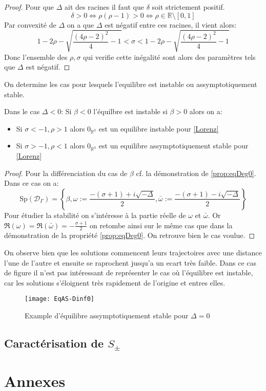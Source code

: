 \documentclass{article}
\newcommand{\R}{\mathbb{R}}
\newtheorem[M , nocut]{prop}{Proposition}[section]
\newtheorem[M]{propt}{Propriété}[section]
\newtheorem[L , nocut]{thm}{Théoreme}
\newtheorem[L]{cor}{Corollaire}
\begin{document}
\begin{proof}
    Pour que $\Delta$ ait des racines il faut que $\delta$ soit strictement positif.
    \[
    \delta > 0 \Leftrightarrow \rho(\rho-1) > 0 \Leftrightarrow \rho \in \R \setminus [0,1]
    \]Par convexité de $\Delta$ on a que $\Delta$ est négatif entre ces racines, il vient alors:
    \[
        1-2 \rho - \sqrt{ \frac{(4\rho-2)^2}{4} -1 } < \sigma < 1-2 \rho - \sqrt{ \frac{(4\rho-2)^2}{4} -1 }
    \]Donc l'ensemble des $\rho,\sigma$ qui verifie cette inégalité sont alors des paramètres tels que $\Delta$ est négatif.
\end{proof}
On determine les cas pour lesquels l'equilibre est instable ou assymptotiquement stable.
\begin{prop}
    Dans le cas $\Delta<0$:
    Si $\beta <0$ l'équilbre est instable si $\beta>0$ alors on a:
    \begin{itemize}
        \item Si $\sigma < -1 , \rho > 1$ alors $0_{\R^3}$ est un equilibre instable pour \eqref{Lorenz}
        \item Si $\sigma > -1 , \rho < 1$ alors $0_{\R^3}$ est un equilibre assymptotiquement stable pour \eqref{Lorenz}
    \end{itemize}
\end{prop}
\begin{proof}
    Pour la différenciation du cas de $\beta$ cf. la démonstration de \ref{prop:eqDeg0}. Dans ce cas on a:
    \[
        \mathrm{Sp}(\mathcal{D}_\Gamma) = \left\{\beta, \omega := \frac{-(\sigma+1)+ i \sqrt{-\Delta}}{2}, \bar{\omega} := \frac{-(\sigma+1)- i \sqrt{-\Delta}}{2}\right\}
    \]Pour étudier la stabilité on s'intéresse à la partie réelle de $\omega$ et $\bar{\omega}$. Or $\Re (\omega) = \Re (\bar{\omega}) = -\frac{\sigma+1}{2}$ on retombe ainsi sur le même cas que dans la démonstration de la propriété \ref{prop:eqDeg0}. On retrouve bien le cas voulue.
\end{proof}
\begin{example}
    On observe bien que les solutions commencent leurs trajectoires avec une distance l'une de l'autre et ensuite se raprochent jusqu'a un ecart très faible. Dans ce cas de figure il n'est pas intéressant de représenter le cas où l'équilibre est instable, car les solutions s'éloignent très rapidement de l'origine et entres elles.
    
    \begin{figure}[ht]
        \centering
        \texttt{[image: EqAS-Dinf0]}
        \caption{Example d'équilibre assymptotiquement stable pour $\Delta=0$}
    \end{figure}
\end{example}
\subsection{Caractérisation de $S_\pm$}
\section{Annexes}
\end{document}
